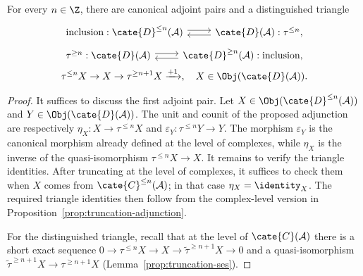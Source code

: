 \begin{proposition}\label{prop:derived-truncation-adjunction}
	For every $n \in \Z$, there are canonical adjoint pairs and a
	distinguished triangle
	\begin{equation*}\begin{gathered}\begin{tikzcd}
		\text{inclusion}: \cate{D}^{\leq n}(\mathcal{A}) \arrow[shift left, r] & \cate{D}(\mathcal{A}) :\tau^{\leq n} \arrow[shift left, l] ,
	\end{tikzcd} \\
	\begin{tikzcd}
		\tau^{\geq n}: \cate{D}(\mathcal{A}) \arrow[shift left, r] & \cate{D}^{\geq n}(\mathcal{A}) :\text{inclusion} \arrow[shift left, l] ,
	\end{tikzcd} \\
		\tau^{\leq n} X \to X \to \tau^{\geq n+1} X \xrightarrow{+1}, \quad X \in \Obj(\cate{D}(\mathcal{A})).
	\end{gathered}\end{equation*}
\end{proposition}

\begin{proof}
	It suffices to discuss the first adjoint pair. Let
	$X \in \Obj(\cate{D}^{\leq n}(\mathcal{A}))$ and
	$Y \in \Obj(\cate{D}(\mathcal{A}))$. The unit and counit of the proposed
	adjunction are respectively
	$\eta_X: X \to \tau^{\leq n} X$ and
	$\varepsilon_Y: \tau^{\leq n} Y \to Y$. The morphism $\varepsilon_Y$ is
	the canonical morphism already defined at the level of complexes, while
	$\eta_X$ is the inverse of the quasi-isomorphism
	$\tau^{\leq n} X \to X$. It remains to verify the triangle identities.
	After truncating at the level of complexes, it suffices to check them when
	$X$ comes from $\cate{C}^{\leq n}(\mathcal{A})$; in that case
	$\eta_X = \identity_X$. The required triangle identities then follow
	from the complex-level version in
	Proposition~\ref{prop:truncation-adjunction}.

	For the distinguished triangle, recall that at the level of
	$\cate{C}(\mathcal{A})$ there is a short exact sequence
	$0 \to \tau^{\leq n} X \to X \to
	\tilde{\tau}^{\geq n+1} X \to 0$ and a quasi-isomorphism
	$\tilde{\tau}^{\geq n+1} X \to \tau^{\geq n+1} X$
	(Lemma~\ref{prop:truncation-ses}).
\end{proof}

